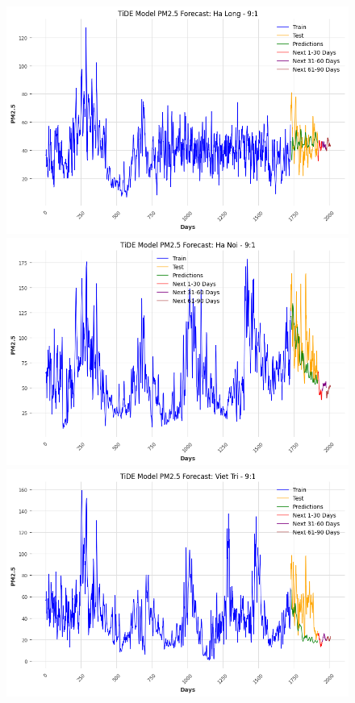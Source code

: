 \begin{figure}[H]
        \begin{minipage}{0.15\textwidth}
            \centering
            \includegraphics[width=1\textwidth]{img/final/TiDE/90D/TiDE_9_1_HL.png}
            \end{minipage}
            \hfill
            \begin{minipage}{0.15\textwidth}
            \centering
            \includegraphics[width=1\textwidth]{img/final/TiDE/90D/TiDE_9_1_HN.png}
            \end{minipage}
            \hfill
            \begin{minipage}{0.15\textwidth}
            \centering
            \includegraphics[width=1\textwidth]{img/final/TiDE/90D/TiDE_9_1_VT.png}

\end{minipage}
\end{figure}
